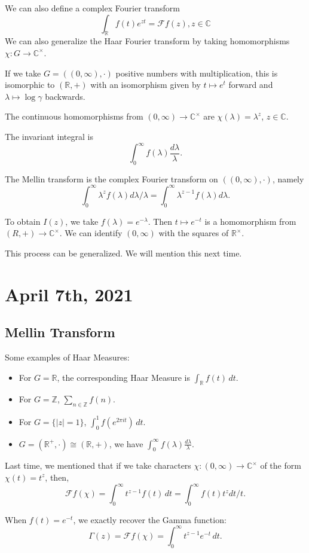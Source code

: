 \documentclass[12pt]{scrartcl}
\newcommand{\Z}{\mathbb{Z}}
\newcommand{\R}{\mathbb{R}}
\newcommand{\C}{\mathbb C}
\let \mc \mathcal
\begin{document}
We can also define a complex Fourier transform 
$$\int_\R f(t) e^{zt} = \mathcal F f(z), z \in \C$$
We can also generalize the Haar Fourier transform by taking homomorphisms $\chi : G \to \C^\times$.  

If we take $G = ((0, \infty), \cdot)$ positive numbers with multiplication, this is isomorphic to $(\R, +)$ with an isomorphism given by $t \mapsto e^t$ forward and $\lambda \mapsto \log \gamma$ backwards.  

The continuous homomorphisms from $(0, \infty) \to \C^\times$ are $\chi(\lambda) = \lambda^z$, $z \in \C$.

The invariant integral is 
$$\int_0^\infty f(\lambda) \frac{d\lambda}{\lambda}.$$

The Mellin transform is the complex Fourier transform on $((0, \infty), \cdot)$, namely
$$\int_0^\infty \lambda^z f(\lambda )d\lambda/\lambda = \int_0^\infty \lambda^{z-1} f(\lambda) d\lambda.  $$

To obtain $I(z)$, we take $f(\lambda) = e^{-\lambda}$.  Then $t \mapsto e^{-t}$ is a homomorphism from $(R, +) \to \C^\times$.  We can identify $(0, \infty)$ with the squares of $\R^\times$.

This process can be generalized.  We will mention this next time.
\pagebreak
\section{April 7th, 2021}
\subsection{Mellin Transform}
Some examples of Haar Measures:
\begin{itemize}
\item For $G = \R$, the corresponding Haar Measure is $\int_\R f(t)\,dt$. 
\item For $G = \Z$, $\sum_{n \in \Z} f(n)$.
\item For $G = \{|z|  = 1\}$, $\int_0^1 f(e^{2\pi i t})\,dt$.
\item $G = (\R^+, \cdot) \cong (\R, +)$, we have $\int_0^\infty f(\lambda) \frac{d\lambda}{\lambda}$.
\end{itemize}

Last time, we mentioned that if we take characters $\chi: (0, \infty) \to \C^\times$ of the form $\chi(t) = t^z$, then,
$$\mc F f(\chi) = \int_0^\infty t^{z-1} f(t)\,dt = \int_0^\infty f(t) t^z dt/t.$$

When $f(t) = e^{-t}$, we exactly recover the Gamma function:
$$\Gamma(z) = \mc F f(\chi) = \int_0^\infty t^{z-1} e^{-t}\,dt.$$
\end{document}
